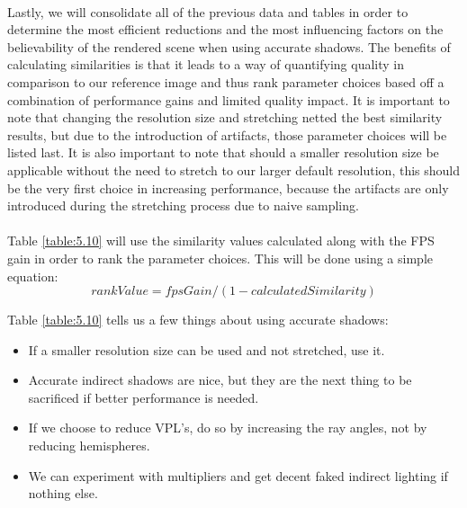 \paragraph{}
Lastly, we will consolidate all of the previous data and tables in order to determine the most efficient reductions and the most influencing factors on the believability of the rendered scene when using accurate shadows.  The benefits of calculating similarities is that it leads to a way of quantifying quality in comparison to our reference image and thus rank parameter choices based off a combination of performance gains and limited quality impact.  It is important to note that changing the resolution size and stretching netted the best similarity results, but due to the introduction of artifacts, those parameter choices will be listed last.  It is also important to note that should a smaller resolution size be applicable without the need to stretch to our larger default resolution, this should be the very first choice in increasing performance, because the artifacts are only introduced during the stretching process due to naive sampling.

\paragraph{}
Table \ref{table:5.10} will use the similarity values calculated along with the FPS gain in order to rank the parameter choices.  This will be done using a simple equation:
\begin{equation}
rankValue = fpsGain / (1-calculatedSimilarity)
\end{equation}

Table \ref{table:5.10} tells us a few things about using accurate shadows:
\begin{itemize}
\item If a smaller resolution size can be used and not stretched, use it.
\item Accurate indirect shadows are nice, but they are the next thing to be sacrificed if better performance is needed.
\item If we choose to reduce VPL's, do so by increasing the ray angles, not by reducing hemispheres.
\item We can experiment with multipliers and get decent faked indirect lighting if nothing else.
\end{itemize}

